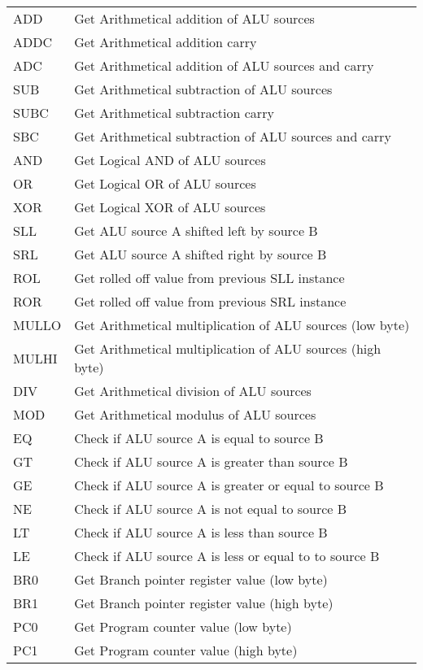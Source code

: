 \begin{longtable}[h!]{| l | p{} |}
	ADD  & Get Arithmetical addition of ALU sources \\
	ADDC & Get Arithmetical addition carry \\
	ADC  & Get Arithmetical addition of ALU sources and carry \\\hline
	
	SUB  & Get Arithmetical subtraction of ALU sources \\
	SUBC & Get Arithmetical subtraction carry \\
	SBC  & Get Arithmetical subtraction of ALU sources and carry \\\hline
	
	AND  & Get Logical AND of ALU sources \\
	OR   & Get Logical OR of ALU sources \\
	XOR  & Get Logical XOR of ALU sources \\\hline
	
	SLL  & Get ALU source A shifted left by source B \\
	SRL  & Get ALU source A shifted right by source B \\
	ROL  & Get rolled off value from previous SLL instance \\
	ROR  & Get rolled off value from previous SRL instance \\\hline
	
	MULLO& Get Arithmetical multiplication of ALU sources (low byte) \\
	MULHI& Get Arithmetical multiplication of ALU sources (high byte) \\
	DIV  & Get Arithmetical division of ALU sources \\
	MOD  & Get Arithmetical modulus of ALU sources \\\hline
	
	EQ   & Check if ALU source A is equal to source B \\
	GT   & Check if ALU source A is greater than source B \\
	GE   & Check if ALU source A is greater or equal to source B \\
	NE   & Check if ALU source A is not equal to source B \\
	LT   & Check if ALU source A is less than source B \\
	LE   & Check if ALU source A is less or equal to to source B \\\hline
	
	BR0  & Get Branch pointer register value (low byte) \\
	BR1  & Get Branch pointer register value (high byte) \\	
	PC0  & Get Program counter value (low byte) \\
	PC1  & Get Program counter value (high byte) \\\hline
	

\end{longtable}
